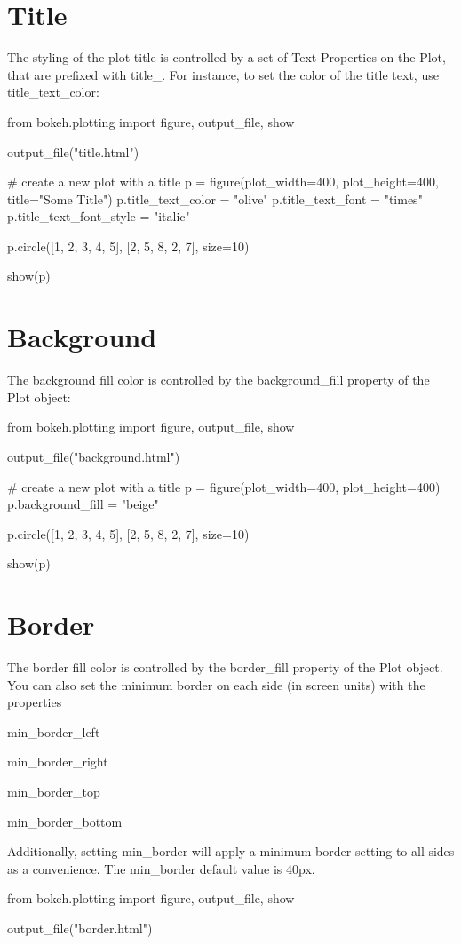 \section{Title}
The styling of the plot title is controlled by a set of Text Properties on the Plot, that are prefixed with title_. For instance, to set the color of the title text, use title_text_color:

from bokeh.plotting import figure, output_file, show

output_file("title.html")

# create a new plot with a title
p = figure(plot_width=400, plot_height=400, title="Some Title")
p.title_text_color = "olive"
p.title_text_font = "times"
p.title_text_font_style = "italic"

p.circle([1, 2, 3, 4, 5], [2, 5, 8, 2, 7], size=10)

show(p)
	
\section{Background}
The background fill color is controlled by the background_fill property of the Plot object:

from bokeh.plotting import figure, output_file, show

output_file("background.html")

# create a new plot with a title
p = figure(plot_width=400, plot_height=400)
p.background_fill = "beige"

p.circle([1, 2, 3, 4, 5], [2, 5, 8, 2, 7], size=10)

show(p)
	\section{Border}
The border fill color is controlled by the border_fill property of the Plot object. You can also set the minimum border on each side (in screen units) with the properties

min_border_left

min_border_right

min_border_top

min_border_bottom

Additionally, setting min_border will apply a minimum border setting to all sides as a convenience. The min_border default value is 40px.

from bokeh.plotting import figure, output_file, show

output_file("border.html")

